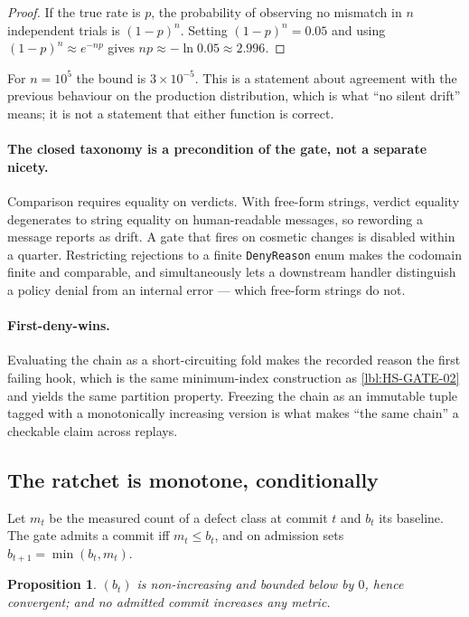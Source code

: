 \documentclass[11pt]{article}
\newtheorem{prop}{Proposition}[section]
\begin{document}
\begin{proof}
If the true rate is $p$, the probability of observing no mismatch in $n$
independent trials is $(1-p)^n$. Setting $(1-p)^n = 0.05$ and using
$(1-p)^n \approx e^{-np}$ gives $np \approx -\ln 0.05 \approx 2.996$.
\end{proof}

For $n = 10^5$ the bound is $3 \times 10^{-5}$. This is a statement about
agreement with the previous behaviour on the production distribution, which is
what ``no silent drift'' means; it is not a statement that either function is
correct.

\paragraph{The closed taxonomy is a precondition of the gate, not a separate
nicety.} Comparison requires equality on verdicts. With free-form strings,
verdict equality degenerates to string equality on human-readable messages, so
rewording a message reports as drift. A gate that fires on cosmetic changes is
disabled within a quarter. Restricting rejections to a finite \texttt{DenyReason}
enum makes the codomain finite and comparable, and simultaneously lets a
downstream handler distinguish a policy denial from an internal error --- which
free-form strings do not.

\paragraph{First-deny-wins.} Evaluating the chain as a short-circuiting fold
makes the recorded reason the first failing hook, which is the same
minimum-index construction as \ref{lbl:HS-GATE-02} and yields the same
partition property. Freezing the chain as an immutable tuple tagged with a
monotonically increasing version is what makes ``the same chain'' a checkable
claim across replays.

\subsection{The ratchet is monotone, conditionally}
\label{lbl:HS-EVID-02}

Let $m_t$ be the measured count of a defect class at commit $t$ and $b_t$ its
baseline. The gate admits a commit iff $m_t \le b_t$, and on admission sets
$b_{t+1} = \min(b_t, m_t)$.

\begin{prop}
$(b_t)$ is non-increasing and bounded below by $0$, hence convergent; and no
admitted commit increases any metric.
\end{prop}
\end{document}
